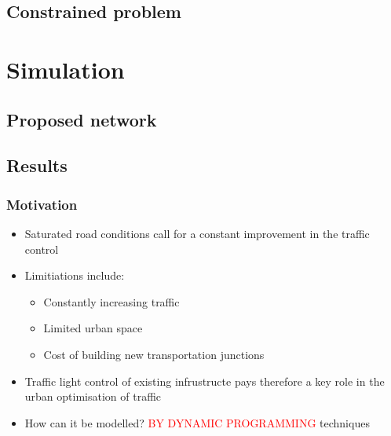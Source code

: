 \documentclass{beamer}
\begin{document}
\subsection{Constrained problem}

\section{Simulation} %
\subsection{Proposed network} %
\subsection{Results} %

\begin{frame}
\frametitle{Motivation}
\begin{itemize}
\item Saturated road conditions call for a constant improvement in the traffic control
\item Limitiations include:
 \begin{itemize}
\item Constantly increasing traffic
\item Limited urban space
\item Cost of building new transportation junctions
\end{itemize}

\item Traffic light control of existing infrustructe pays therefore a key role in the urban optimisation of traffic
\item How can it be modelled? \textcolor{red}{BY DYNAMIC PROGRAMMING} techniques

\end{itemize}



\end{frame}
\end{document}
